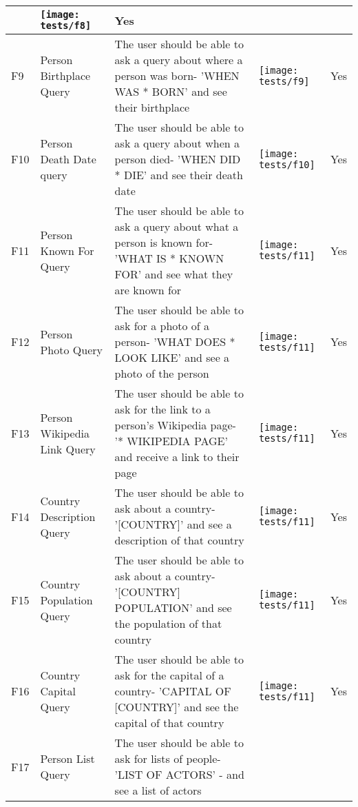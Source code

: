 \begin{landscape}
\begin{tabularx}{\hsize}{lXXXr}
		& \texttt{[image: tests/f8]} & Yes \\
		\bottomrule
		F9 & Person Birthplace Query
		& The user should be able to ask a query about where a person was born\newline - 'WHEN WAS * BORN' and see their birthplace
		& \texttt{[image: tests/f9]} & Yes \\
		\bottomrule
		F10 & Person Death Date query
		& The user should be able to ask a query about when a person died\newline - 'WHEN DID * DIE' and see their death date
		& \texttt{[image: tests/f10]} & Yes \\
		\bottomrule
		F11 & Person Known For Query
		& The user should be able to ask a query about what a person is known for\newline - 'WHAT IS * KNOWN FOR' and see what they are known for
		& \texttt{[image: tests/f11]} & Yes \\
		\bottomrule
		F12 & Person Photo Query
		& The user should be able to ask for a photo of a person\newline - 'WHAT DOES * LOOK LIKE' and see a photo of the person
		& \texttt{[image: tests/f11]} & Yes \\
		\bottomrule
		F13 & Person Wikipedia Link Query
		& The user should be able to ask for the link to a person's Wikipedia page\newline - '* WIKIPEDIA PAGE' and receive a link to their page
		& \texttt{[image: tests/f11]} & Yes \\
		\bottomrule
		F14 & Country Description Query
		& The user should be able to ask about a country\newline - '[COUNTRY]' and see a description of that country
		& \texttt{[image: tests/f11]} & Yes \\
		\bottomrule
		F15 & Country Population Query
		& The user should be able to ask about a country\newline - '[COUNTRY] POPULATION' and see the population of that country
		& \texttt{[image: tests/f11]} & Yes \\
		\bottomrule
		F16 & Country Capital Query
		& The user should be able to ask for the capital of a country\newline - 'CAPITAL OF [COUNTRY]' and see the capital of that country
		& \texttt{[image: tests/f11]} & Yes \\
		\bottomrule
		F17 & Person List Query
		& The user should be able to ask for lists of people\newline - 'LIST OF ACTORS' - and see a list of actors 

\end{tabularx}
\end{landscape}
